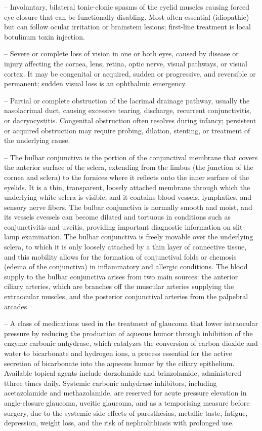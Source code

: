 -- Involuntary, bilateral tonic-clonic spasms of the eyelid muscles causing forced eye closure that can be functionally disabling. Most often essential (idiopathic) but can follow ocular irritation or brainstem lesions; first-line treatment is local botulinum toxin injection.

-- Severe or complete loss of vision in one or both eyes, caused by disease or injury affecting the cornea, lens, retina, optic nerve, visual pathways, or visual cortex. It may be congenital or acquired, sudden or progressive, and reversible or permanent; sudden visual loss is an ophthalmic emergency.

-- Partial or complete obstruction of the lacrimal drainage pathway, usually the nasolacrimal duct, causing excessive tearing, discharge, recurrent conjunctivitis, or dacryocystitis. Congenital obstruction often resolves during infancy; persistent or acquired obstruction may require probing, dilation, stenting, or treatment of the underlying cause.

-- The bulbar conjunctiva is the portion of the conjunctival membrane that covers the anterior surface of the sclera, extending from the limbus (the junction of the cornea and sclera) to the fornices where it reflects onto the inner surface of the eyelids. It is a thin, transparent, loosely attached membrane through which the underlying white sclera is visible, and it contains blood vessels, lymphatics, and sensory nerve fibers. The bulbar conjunctiva is normally smooth and moist, and its vessels cvessels can become dilated and tortuous in conditions such as conjunctivitis and uveitis, providing important diagnostic information on slit-lamp examination. The bulbar conjunctiva is freely movable over the underlying sclera, to which it is only loosely attached by a thin layer of connective tissue, and this mobility allows for the formation of conjunctival folds or chemosis (edema of the conjunctiva) in inflammatory and allergic conditions. The blood supply to the bulbar conjunctiva arises from two main sources: the anterior ciliary arteries, which are branches off the muscular arteries supplying the extraocular muscles, and the posterior conjunctival arteries from the palpebral arcades.

-- A class of medications used in the treatment of glaucoma that lower intraocular pressure by reducing the production of aqueous humor through inhibition of the enzyme carbonic anhydrase, which catalyzes the conversion of carbon dioxide and water to bicarbonate and hydrogen ions, a process essential for the active secretion of bicarbonate into the aqueous humor by the ciliary epithelium. Available topical agents include dorzolamide and brinzolamide, administered tthree times daily. Systemic carbonic anhydrase inhibitors, including acetazolamide and methazolamide, are reserved for acute pressure elevation in angle-closure glaucoma, uveitic glaucoma, and as a temporising measure before surgery, due to the systemic side effects of paresthesias, metallic taste, fatigue, depression, weight loss, and the risk of nephrolithiasis with prolonged use.


